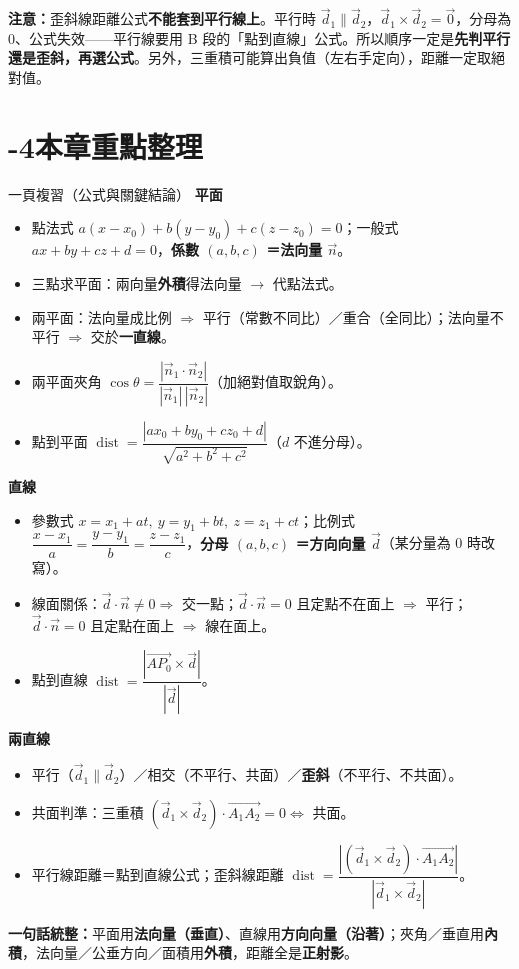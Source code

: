\documentclass[11pt]{article}
\begin{document}
\textbf{注意：}歪斜線距離公式\textbf{不能套到平行線上}。平行時 $\vec d_1\parallel\vec d_2$，$\vec d_1\times\vec d_2=\vec0$，分母為 0、公式失效——平行線要用 B 段的「點到直線」公式。所以順序一定是\textbf{先判平行還是歪斜，再選公式}。另外，三重積可能算出負值（左右手定向），距離一定取絕對值。

\section*{-4\quad 本章重點整理}

\begin{補充框}{一頁複習（公式與關鍵結論）}
\textbf{平面}
\begin{itemize}\setlength{\itemsep}{1pt}
\item 點法式 $a(x-x_0)+b(y-y_0)+c(z-z_0)=0$；一般式 $ax+by+cz+d=0$，\textbf{係數 $(a,b,c)$ ＝法向量 $\vec n$}。
\item 三點求平面：兩向量\textbf{外積}得法向量 $\rightarrow$ 代點法式。
\item 兩平面：法向量成比例 $\Rightarrow$ 平行（常數不同比）／重合（全同比）；法向量不平行 $\Rightarrow$ 交於\textbf{一直線}。
\item 兩平面夾角 $\cos\theta=\dfrac{|\vec n_1\cdot\vec n_2|}{|\vec n_1|\,|\vec n_2|}$（加絕對值取銳角）。
\item 點到平面 $\operatorname{dist}=\dfrac{|ax_0+by_0+cz_0+d|}{\sqrt{a^2+b^2+c^2}}$（$d$ 不進分母）。
\end{itemize}
\textbf{直線}
\begin{itemize}\setlength{\itemsep}{1pt}
\item 參數式 $x=x_1+at,\ y=y_1+bt,\ z=z_1+ct$；比例式 $\dfrac{x-x_1}{a}=\dfrac{y-y_1}{b}=\dfrac{z-z_1}{c}$，\textbf{分母 $(a,b,c)$ ＝方向向量 $\vec d$}（某分量為 0 時改寫）。
\item 線面關係：$\vec d\cdot\vec n\ne0\Rightarrow$ 交一點；$\vec d\cdot\vec n=0$ 且定點不在面上 $\Rightarrow$ 平行；$\vec d\cdot\vec n=0$ 且定點在面上 $\Rightarrow$ 線在面上。
\item 點到直線 $\operatorname{dist}=\dfrac{|\vec{AP_0}\times\vec d|}{|\vec d|}$。
\end{itemize}
\textbf{兩直線}
\begin{itemize}\setlength{\itemsep}{1pt}
\item 平行（$\vec d_1\parallel\vec d_2$）／相交（不平行、共面）／\textbf{歪斜}（不平行、不共面）。
\item 共面判準：三重積 $(\vec d_1\times\vec d_2)\cdot\vec{A_1A_2}=0\iff$ 共面。
\item 平行線距離＝點到直線公式；歪斜線距離 $\operatorname{dist}=\dfrac{|(\vec d_1\times\vec d_2)\cdot\vec{A_1A_2}|}{|\vec d_1\times\vec d_2|}$。
\end{itemize}
\textbf{一句話統整：}平面用\textbf{法向量（垂直）}、直線用\textbf{方向向量（沿著）}；夾角／垂直用\textbf{內積}，法向量／公垂方向／面積用\textbf{外積}，距離全是\textbf{正射影}。
\end{補充框}
\end{document}
